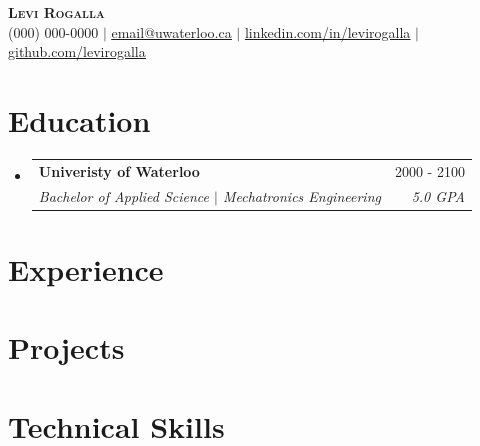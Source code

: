 \documentclass[letterpaper,11pt]{article}
\makeatletter
\newcommand{\resumeSubheading}[4]{
	\vspace{-2pt}\item
	\begin{tabular*}{0.97\textwidth}[t]{l@{\extracolsep{\fill}}r}
		\textbf{#1} & #2 \\
		\textit{\small#3} & \textit{\small #4} \\
	\end{tabular*}\vspace{-7pt}
}
\newcommand{\resumeSubHeadingListStart}{\begin{itemize}[leftmargin=0.15in, label={}]}
\newcommand{\resumeSubHeadingListEnd}{\end{itemize}}
\makeatother
\begin{document}
	
	
	\begin{center}
		\textbf{\Huge \scshape Levi Rogalla} \\ \vspace{1pt}
		\small (000) 000-0000 $|$ \href{mailto:email@uwaterloo.ca}{\underline{email@uwaterloo.ca}} $|$ 
		\href{https://linkedin.com/in/levirogalla}{\underline{linkedin.com/in/levirogalla}} $|$
		\href{https://github.com/levirogalla}{\underline{github.com/levirogalla}}
	\end{center}
	
	
	\section{Education}
	\resumeSubHeadingListStart
	\resumeSubheading
	{Univeristy of Waterloo}{2000 - 2100}
	{Bachelor of Applied Science $|$ Mechatronics Engineering}{5.0 GPA}
	\resumeSubHeadingListEnd
	
	
	\section{Experience}
	\resumeSubHeadingListStart


	\resumeSubHeadingListEnd
	\section{Projects} 
	\resumeSubHeadingListStart


	\resumeSubHeadingListEnd
	\section{Technical Skills}
	\begin{itemize}[leftmargin=0.15in, label={}]
		\small{\item{
		}}
	\end{itemize}

	
\end{document}
